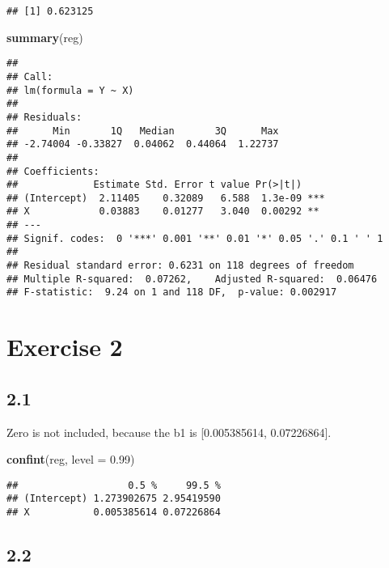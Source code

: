 \documentclass[
]{article}
\newenvironment{Shaded}{\begin{snugshade}}{\end{snugshade}}
\newcommand{\DataTypeTok}[1]{\textcolor[rgb]{0.13,0.29,0.53}{#1}}
\newcommand{\FloatTok}[1]{\textcolor[rgb]{0.00,0.00,0.81}{#1}}
\newcommand{\KeywordTok}[1]{\textcolor[rgb]{0.13,0.29,0.53}{\textbf{#1}}}
\newcommand{\NormalTok}[1]{#1}
\begin{document}
\begin{verbatim}
## [1] 0.623125
\end{verbatim}

\begin{Shaded}
\begin{Highlighting}[]
\KeywordTok{summary}\NormalTok{(reg)}
\end{Highlighting}
\end{Shaded}

\begin{verbatim}
## 
## Call:
## lm(formula = Y ~ X)
## 
## Residuals:
##      Min       1Q   Median       3Q      Max 
## -2.74004 -0.33827  0.04062  0.44064  1.22737 
## 
## Coefficients:
##             Estimate Std. Error t value Pr(>|t|)    
## (Intercept)  2.11405    0.32089   6.588  1.3e-09 ***
## X            0.03883    0.01277   3.040  0.00292 ** 
## ---
## Signif. codes:  0 '***' 0.001 '**' 0.01 '*' 0.05 '.' 0.1 ' ' 1
## 
## Residual standard error: 0.6231 on 118 degrees of freedom
## Multiple R-squared:  0.07262,    Adjusted R-squared:  0.06476 
## F-statistic:  9.24 on 1 and 118 DF,  p-value: 0.002917
\end{verbatim}

\hypertarget{exercise-2}{%
\section{Exercise 2}\label{exercise-2}}

\hypertarget{section-6}{%
\subsection{2.1}\label{section-6}}

Zero is not included, because the b1 is {[}0.005385614, 0.07226864{]}.

\begin{Shaded}
\begin{Highlighting}[]
\KeywordTok{confint}\NormalTok{(reg, }\DataTypeTok{level =} \FloatTok{0.99}\NormalTok{)}
\end{Highlighting}
\end{Shaded}

\begin{verbatim}
##                   0.5 %     99.5 %
## (Intercept) 1.273902675 2.95419590
## X           0.005385614 0.07226864
\end{verbatim}

\hypertarget{section-7}{%
\subsection{2.2}\label{section-7}}
\end{document}
